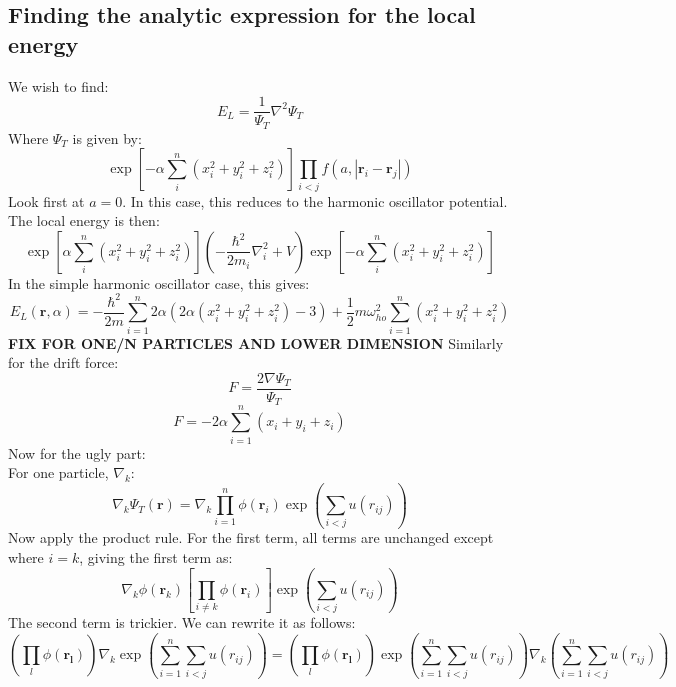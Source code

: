 \documentclass[a4paper, 10pt]{article}
\begin{document}
\begin{appendices}
\section{Finding the analytic expression for the local energy}
We wish to find:
\begin{equation}
E_L=\frac{1}{\Psi_T}\nabla^2 \Psi_T
\end{equation}
Where $\Psi_T$ is given by:
\begin{equation}
\exp\left[ -\alpha \sum_{i}^n\left(x_i^2+y_i^2+z_i^2\right)\right]\prod_{i<j}f(a, |\mathbf{r}_i-\mathbf{r}_j|)
\end{equation}
Look first at $a=0$. In this case, this reduces to the harmonic oscillator potential. The local energy is then:
\begin{equation}
\exp\left[ \alpha \sum_{i}^n\left(x_i^2+y_i^2+z_i^2\right)\right]\left(-\frac{\hbar^2}{2m_i}\nabla_i^2+V\right)\exp\left[ -\alpha \sum_{i}^n\left(x_i^2+y_i^2+z_i^2\right)\right]
\end{equation}
In the simple harmonic oscillator case, this gives:
\begin{equation}
E_L(\mathbf{r},\alpha)=-\frac{\hbar^2}{2m}\sum_{i=1}^n 2\alpha \left(2\alpha(x_i^2+y_i^2+z_i^2)-3\right)+\frac{1}{2}m\omega_{ho}^2\sum_{i=1}^n(x_i^2+y_i^2+z_i^2)
\end{equation}
\textbf{FIX FOR ONE/N PARTICLES AND LOWER DIMENSION}
Similarly for the drift force:
\begin{equation}
F=\frac{2\nabla \Psi_T}{\Psi_T}
\end{equation}
\begin{equation}
F=-2\alpha\sum_{i=1}^n(x_i+y_i+z_i)
\end{equation}
Now for the ugly part:\\
For one particle, $\nabla_k$:
\begin{equation}
\nabla_k\Psi_T(\mathbf{r})=\nabla_k \prod_{i=1}^n\phi(\mathbf{r}_i)\exp\left(\sum_{i<j} u(r_{ij})\right)
\end{equation}
Now apply the product rule. For the first term, all terms are unchanged except where $i=k$, giving the first term as:
\begin{equation}
\nabla_k \phi(\mathbf{r}_k)\left[ \prod_{i\neq k} \phi(\mathbf{r}_i)\right]\exp\left(\sum_{i<j}u(r_{ij})\right)
\end{equation}
The second term is trickier. We can rewrite it as follows:
\begin{equation}
\left(\prod_l \phi(\mathbf{r_l})\right)\nabla_k \exp \left(\sum_{i=1}^n \sum_{i<j} u(r_{ij})\right)=\left(\prod_l \phi(\mathbf{r_l})\right) \exp \left(\sum_{i=1}^n \sum_{i<j} u(r_{ij})\right)\nabla_k\left(\sum_{i=1}^n \sum_{i<j} u(r_{ij})\right)

\end{equation}
\end{appendices}
\end{document}
